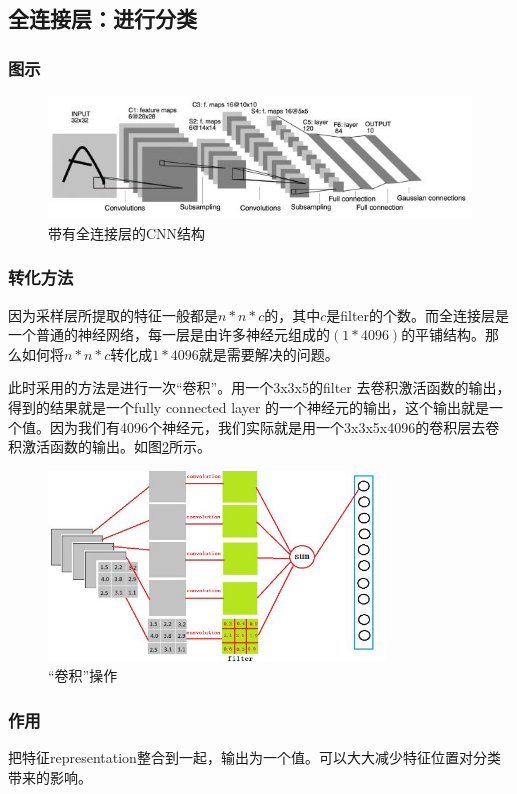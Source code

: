 \documentclass[UTF8]{ctexart}
\begin{document}
\subsection{全连接层：进行分类}
\subsubsection{图示}
\begin{figure}[htb]
	\centering
	\includegraphics[width=1.0\textwidth]{figures/fullconnector1.jpg}
	\caption{带有全连接层的CNN结构}
	\label{fullconnector1}
\end{figure}
\subsubsection{转化方法}
因为采样层所提取的特征一般都是$n*n*c$的，其中$c$是filter的个数。而全连接层是一个普通的神经网络，每一层是由许多神经元组成的$(1*4096)$的平铺结构。那么如何将$n*n*c$转化成$1*4096$就是需要解决的问题。
\par 此时采用的方法是进行一次“卷积”。用一个3x3x5的filter 去卷积激活函数的输出，得到的结果就是一个fully connected layer 的一个神经元的输出，这个输出就是一个值。因为我们有4096个神经元，我们实际就是用一个3x3x5x4096的卷积层去卷积激活函数的输出。如图\ref{fullconnector2}所示。
\begin{figure}[htb]
	\centering
	\includegraphics[width=0.8\textwidth]{figures/fullconnector2.jpg}
	\caption{“卷积”操作}
	\label{fullconnector2}
\end{figure}
\subsubsection{作用}
把特征representation整合到一起，输出为一个值。可以大大减少特征位置对分类带来的影响。
\end{document}

